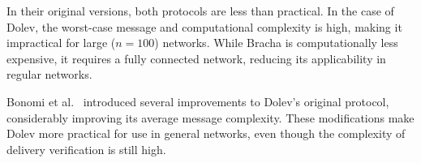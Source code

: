 In their original versions, both protocols are less than practical. In the case of Dolev, the worst-case message and computational complexity is high, making it impractical for large ($n=100$) networks. While Bracha is computationally less expensive, it requires a fully connected network, reducing its applicability in regular networks.

Bonomi et al.~\cite{bonomi2019multihop} introduced several improvements to Dolev's original protocol, considerably improving its average message complexity. These modifications make Dolev more practical for use in general networks, even though the complexity of delivery verification is still high. 


